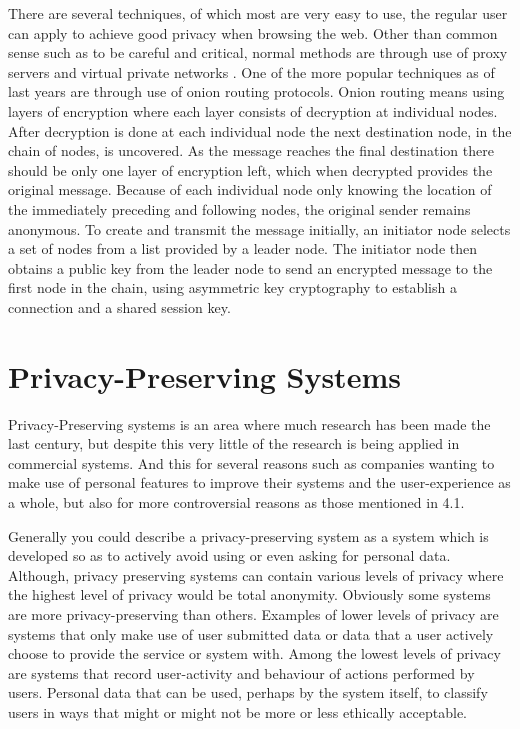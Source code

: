 There are several techniques, of which most are very easy to use, the regular user can apply to achieve good privacy when browsing the web. Other than common sense such as to be careful and critical, normal methods are through use of proxy servers and virtual private networks \cite{Hoffman2010}. One of the more popular techniques as of last years are through use of onion routing protocols. Onion routing means using layers of encryption where each layer consists of decryption at individual nodes. After decryption is done at each individual node the next destination node, in the chain of nodes, is uncovered. As the message reaches the final destination there should be only one layer of encryption left, which when decrypted provides the original message. Because of each individual node only knowing the location of the immediately preceding and following nodes, the original sender remains anonymous. To create and transmit the message initially, an initiator node selects a set of nodes from a list provided by a leader node. The initiator node then obtains a public key from the leader node to send an encrypted message to the first node in the chain, using asymmetric key cryptography to establish a connection and a shared session key.

\section{Privacy-Preserving Systems}

Privacy-Preserving systems is an area where much research has been made the last century, but despite this very little of the research is being applied in commercial systems. And this for several reasons such as companies wanting to make use of personal features to improve their systems and the user-experience as a whole, but also for more controversial reasons as those mentioned in 4.1.

Generally you could describe a privacy-preserving system as a system which is developed so as to actively avoid using or even asking for personal data. Although, privacy preserving systems can contain various levels of privacy where the highest level of privacy would be total anonymity. Obviously some systems are more privacy-preserving than others. Examples of lower levels of privacy are systems that only make use of user submitted data or data that a user actively choose to provide the service or system with. Among the lowest levels of privacy are systems that record user-activity and behaviour of actions performed by users. Personal data that can be used, perhaps by the system itself, to classify users in ways that might or might not be more or less ethically acceptable.


